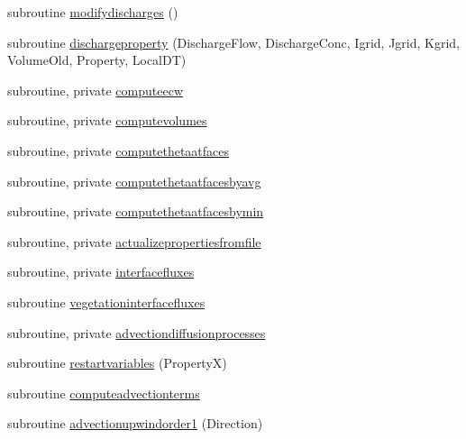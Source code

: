 \begin{DoxyCompactItemize}
\item 
subroutine \mbox{\hyperlink{namespacemoduleporousmediaproperties_a4b551b0430b61a97ca5a026b6467c003}{modifydischarges}} ()
\item 
subroutine \mbox{\hyperlink{namespacemoduleporousmediaproperties_a0e66cb3f0270a54dfa87774f558ac3d5}{dischargeproperty}} (Discharge\+Flow, Discharge\+Conc, Igrid, Jgrid, Kgrid, Volume\+Old, Property, Local\+DT)
\item 
subroutine, private \mbox{\hyperlink{namespacemoduleporousmediaproperties_a32b1336499ea5a5ca4e733054acee536}{computeecw}}
\item 
subroutine, private \mbox{\hyperlink{namespacemoduleporousmediaproperties_a8fba489b1d7b502e23196a791d678e03}{computevolumes}}
\item 
subroutine, private \mbox{\hyperlink{namespacemoduleporousmediaproperties_a534ab2ca9e28f31cfce1876b53c263c8}{computethetaatfaces}}
\item 
subroutine, private \mbox{\hyperlink{namespacemoduleporousmediaproperties_ac3225dfdb6a7475838f45e43263a61a9}{computethetaatfacesbyavg}}
\item 
subroutine, private \mbox{\hyperlink{namespacemoduleporousmediaproperties_a14becd6de87b194f724f94c34247ee36}{computethetaatfacesbymin}}
\item 
subroutine, private \mbox{\hyperlink{namespacemoduleporousmediaproperties_a34afbe14179f6a786f5504a52ce2d220}{actualizepropertiesfromfile}}
\item 
subroutine, private \mbox{\hyperlink{namespacemoduleporousmediaproperties_a9754a9e3d41ba3152a613bda8646ffae}{interfacefluxes}}
\item 
subroutine \mbox{\hyperlink{namespacemoduleporousmediaproperties_a81fcc32210036b193860971be2aa8f12}{vegetationinterfacefluxes}}
\item 
subroutine, private \mbox{\hyperlink{namespacemoduleporousmediaproperties_ab176bef10683035ac59beb9b6b893728}{advectiondiffusionprocesses}}
\item 
subroutine \mbox{\hyperlink{namespacemoduleporousmediaproperties_afc91dc82442179a1d26d776a3a1007d6}{restartvariables}} (PropertyX)
\item 
subroutine \mbox{\hyperlink{namespacemoduleporousmediaproperties_af0fd7f987acaa1a952f02b3bdedf1b8a}{computeadvectionterms}}
\item 
subroutine \mbox{\hyperlink{namespacemoduleporousmediaproperties_ab1e6a246ea1f6819438e21e75cf2de59}{advectionupwindorder1}} (Direction)
\item 

\end{DoxyCompactItemize}
